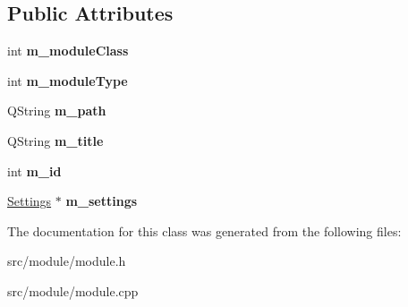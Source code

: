 \subsection*{Public Attributes}
\begin{DoxyCompactItemize}
\item 
\hypertarget{classModule_ac06a40ee7c7650f5217629331a54c7d9}{
int {\bfseries m\_\-moduleClass}}
\label{classModule_ac06a40ee7c7650f5217629331a54c7d9}

\item 
\hypertarget{classModule_a52983f302ddb954c04e6c1f60038ae36}{
int {\bfseries m\_\-moduleType}}
\label{classModule_a52983f302ddb954c04e6c1f60038ae36}

\item 
\hypertarget{classModule_ab42cd52d1650e86af4f6a8815def69d4}{
QString {\bfseries m\_\-path}}
\label{classModule_ab42cd52d1650e86af4f6a8815def69d4}

\item 
\hypertarget{classModule_a9784caf57e8e128fb6a2dcaca36ac8c7}{
QString {\bfseries m\_\-title}}
\label{classModule_a9784caf57e8e128fb6a2dcaca36ac8c7}

\item 
\hypertarget{classModule_a39645c314a94d0b48e0b91693fe4bbf0}{
int {\bfseries m\_\-id}}
\label{classModule_a39645c314a94d0b48e0b91693fe4bbf0}

\item 
\hypertarget{classModule_a0d5b4c96e1d25aef475b5f415b736cc9}{
\hyperlink{classSettings}{Settings} $\ast$ {\bfseries m\_\-settings}}
\label{classModule_a0d5b4c96e1d25aef475b5f415b736cc9}

\end{DoxyCompactItemize}


The documentation for this class was generated from the following files:\begin{DoxyCompactItemize}
\item 
src/module/module.h\item 
src/module/module.cpp\end{DoxyCompactItemize}
